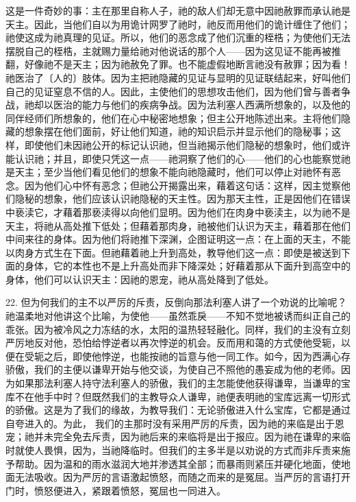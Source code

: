 这是一件奇妙的事：主在那里自称人子，祂的敌人们却无意中因祂赦罪而承认祂是天主。因此，当他们自以为用诡计网罗了祂时，祂反而用他们的诡计缠住了他们；祂使这成为祂真理的见证。所以，他们的恶念成了他们沉重的桎梏；为使他们无法摆脱自己的桎梏，主就赐力量给祂对他说话的那个人——因为这见证不能再被推翻，好像祂不是天主；因为祂赦免了罪。也不能虚假地断言祂没有赦罪；因为看！祂医治了〔人的〕肢体。因为主把祂隐藏的见证与显明的见证联结起来，好叫他们自己的见证窒息不信的人。因此，主使他们的思想攻击他们，因为他们曾与善者争战，祂却以医治的能力与他们的疾病争战。因为法利塞人西满所想象的，以及他的同伴经师们所想象的，他们在心中秘密地想象；但主公开地陈述出来。主将他们隐藏的想象摆在他们面前，好让他们知道，祂的知识启示并显示他们的隐秘事；这样，即使他们未因祂公开的标记认识祂，但当祂揭示他们隐秘的想象时，他们或许能认识祂；并且，即使只凭这一点——祂洞察了他们的心——他们的心也能察觉祂是天主；至少当他们看见他们的想象不能向祂隐藏时，他们可以停止对祂怀有恶念。因为他们心中怀有恶念；但祂公开揭露出来，藉着这句话：这样，因主觉察他们隐秘的想象，他们应该认识祂隐秘的天主性。因为那天主性，正是因他们在错误中亵渎它，才藉着那亵渎得以向他们显明。因为他们在肉身中亵渎主，以为祂不是天主，将祂从高处推下低处；但藉着那肉身，祂被他们认识为天主，藉着那在他们中间来往的身体。因为他们将祂推下深渊，企图证明这一点：在上面的天主，不能以肉身方式生在下面。但祂藉着祂上升到高处，教导他们这一点：即使是被送到下面的身体，它的本性也不是上升高处而非下降深处；好藉着那从下面升到高空中的身体，他们可以认识天主：因祂的恩宠，祂从高处降到了低处。\par

22. 但为何我们的主不以严厉的斥责，反倒向那法利塞人讲了一个劝说的比喻呢？祂温柔地对他讲这个比喻，为使他——虽然乖戾——不知不觉地被诱而纠正自己的乖张。因为被冷风之力冻结的水，太阳的温热轻轻融化。同样，我们的主没有立刻严厉地反对他，恐怕给悖逆者以再次悖逆的机会。反而用和蔼的方式使他受轭，以便在受轭之后，即使他悖逆，也能按祂的旨意与他一同工作。如今，因为西满心存骄傲，我们的主便以谦卑开始与他交谈，为使自己不照他的愚妄成为他的老师。因为如果那法利塞人持守法利塞人的骄傲，我们的主怎能使他获得谦卑，当谦卑的宝库不在他手中时？但既然我们的主教导众人谦卑，祂便表明祂的宝库远离一切形式的骄傲。这是为了我们的缘故，为教导我们：无论骄傲进入什么宝库，它都是通过自夸进入的。为此， 我们的主那时没有采用严厉的斥责，因为祂的来临是出于恩宠；祂并未完全免去斥责，因为祂后来的来临将是出于报应。因为祂在谦卑的来临时就使人畏惧，因为，当祂降临时。但我们的主多半是以劝说的方式而非斥责来施予帮助。因为温和的雨水滋润大地并渗透其全部；而暴雨则紧压并硬化地面，使地面无法吸收。因为严厉的言语激起愤怒，而随之而来的是冤屈。当严厉的言语打开门时，愤怒便进入，紧跟着愤怒，冤屈也一同进入。\par

